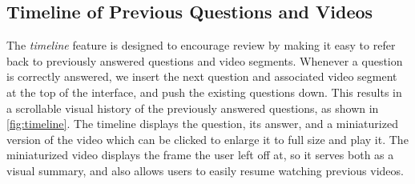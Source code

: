 \documentclass{sigchi}
\begin{document}


\subsection{Timeline of Previous Questions and Videos}

The \emph{timeline} feature is designed to encourage review by making it easy to refer back to previously answered questions and video segments. Whenever a question is correctly answered, we insert the next question and associated video segment at the top of the interface, and push the existing questions down. This results in a scrollable visual history of the previously answered questions, as shown in \autoref{fig:timeline}. The timeline displays the question, its answer, and a miniaturized version of the video which can be clicked to enlarge it to full size and play it. The miniaturized video displays the frame the user left off at, so it serves both as a visual summary, and also allows users to easily resume watching previous videos.%
\end{document}
